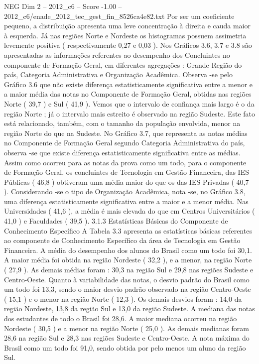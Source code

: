 \begin{textsample}{NEG Dim 2 – 2012\_c6 – Score -1.00 – 2012\_c6/enade\_2012\_tec\_gest\_fin\_8526ca4e82.txt}
Por ser um coeficiente pequeno, a distribuição apresenta uma leve concentração à direita e cauda maior à esquerda.
Já nas regiões Norte e Nordeste os histogramas possuem assimetria levemente positiva ( respectivamente 0,27 e 0,03 ).
Nos Gráficos 3.6, 3.7 e 3.8 são apresentadas as informações referentes ao desempenho dos Concluintes no componente de Formação Geral, em diferentes agregações : Grande Região do país, Categoria Administrativa e Organização Acadêmica.
Observa -se pelo Gráfico 3.6 que não existe diferença estatisticamente significativa entre a menor e a maior média das notas no Componente de Formação Geral, obtidas nas regiões Norte ( 39,7 ) e Sul ( 41,9 ).
Vemos que o intervalo de confiança mais largo é o da região Norte ; já o intervalo mais estreito é observado na região Sudeste.
Este fato está relacionado, também, com o tamanho da população envolvida, menor na região Norte do que na Sudeste.
No Gráfico 3.7, que representa as notas médias no Componente de Formação Geral segundo Categoria Administrativa do país, observa -se que existe diferença estatisticamente significativa entre as médias.
Assim como ocorreu para as notas da prova como um todo, para o componente de Formação Geral, os concluintes de Tecnologia em Gestão Financeira, das IES Públicas ( 46,8 ) obtiveram uma média maior do que os das IES Privadas ( 40,7 ).
Considerando -se o tipo de Organização Acadêmica, nota -se, no Gráfico 3.8, uma diferença estatisticamente significativa entre a maior e a menor média.
Nas Universidades ( 41,6 ), a média é mais elevada do que em Centros Universitários ( 41,0 ) e Faculdades ( 39,5 ). 3.1.3 Estatísticas Básicas do Componente de Conhecimento Específico A Tabela 3.3 apresenta as estatísticas básicas referentes ao componente de Conhecimento Específico da área de Tecnologia em Gestão Financeira.
A média do desempenho dos alunos do Brasil como um todo foi 30,1.
A maior média foi obtida na região Nordeste ( 32,2 ), e a menor, na região Norte ( 27,9 ).
As demais médias foram : 30,3 na região Sul e 29,8 nas regiões Sudeste e Centro-Oeste.
Quanto à variabilidade das notas, o desvio padrão do Brasil como um todo foi 13,3, sendo o maior desvio padrão observado na região Centro-Oeste ( 15,1 ) e o menor na região Norte ( 12,3 ).
Os demais desvios foram : 14,0 da região Nordeste, 13,8 da região Sul e 13,0 da região Sudeste.
A mediana das notas dos estudantes de todo o Brasil foi 28,6.
A maior mediana ocorreu na região Nordeste ( 30,5 ) e a menor na região Norte ( 25,0 ).
As demais medianas foram 28,6 na região Sul e 28,3 nas regiões Sudeste e Centro-Oeste.
A nota máxima do Brasil como um todo foi 91,0, sendo obtida por pelo menos um aluno da região Sul.

\end{textsample}
